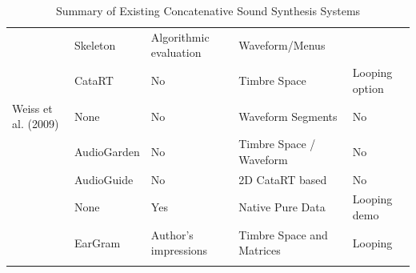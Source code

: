 \begin{table}
\begin{threeparttable}
\begin{centering}
\begin{tabular}{l l l l l}
				\cite{Jehan2005}                  & Skeleton                      & Algorithmic evaluation & Waveform/Menus               &                \\
				\cite{Schwarz2006}                & CataRT                        & No                     & Timbre Space              & Looping option \\
			    Weiss et al. (2009)           & None                          & No                     & Waveform Segments            & No             \\
				\cite{Frisson2010}         & AudioGarden                   & No                     & Timbre Space / Waveform   & No             \\
				\cite{Hackbarth2010}			& AudioGuide                    & No                     & 2D CataRT based              & No             \\
				\cite{OConnell2011}             & None                          & Yes                    & Native Pure Data             & Looping demo   \\
				\cite{Bernardes2013}            & EarGram                       & Author's impressions   & Timbre Space and Matrices & Looping			\\	
				\tablebot		
			\end{tabular}
			\par \end{centering}		
		\begin{tablenotes}
			\small
		\end{tablenotes}
			\caption[Summary of Existing Concatenative Sound Synthesis Systems]{Summary of Existing Concatenative Sound Synthesis Systems}
			\label{tab:concat_system_summary}
	\end{threeparttable}
\end{table}

